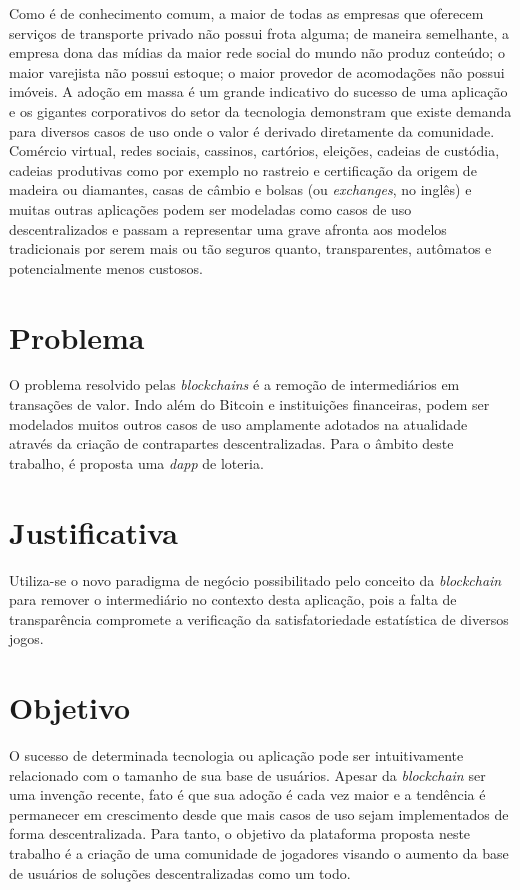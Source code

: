 \documentclass[a4paper,12pt]{monografia}
\theoremstyle{plain}
\theoremstyle{definition}
\theoremstyle{remark}
\begin{document}
Como \'{e} de conhecimento comum, a maior de todas as empresas que oferecem servi\c{c}os de transporte privado n\~{a}o possui frota alguma; de maneira semelhante, a empresa dona das m\'{i}dias da maior rede social do mundo n\~{a}o produz conte\'{u}do; o maior varejista n\~{a}o possui estoque; o maior provedor de acomoda\c{c}\~{o}es n\~{a}o possui im\'{o}veis.
A ado\c{c}\~{a}o em massa \'{e} um grande indicativo do sucesso de uma aplica\c{c}\~{a}o e os gigantes corporativos do setor da tecnologia demonstram que existe demanda para diversos casos de uso onde o valor \'{e} derivado diretamente da comunidade.
Com\'{e}rcio virtual, redes sociais, cassinos, cart\'{o}rios, elei\c{c}\~{o}es, cadeias de cust\'{o}dia, cadeias produtivas como por exemplo no rastreio e certifica\c{c}\~{a}o da origem de madeira ou diamantes, casas de c\^{a}mbio e bolsas (ou \textit{exchanges}, no ingl\^{e}s) e muitas outras aplica\c{c}\~{o}es podem ser modeladas como casos de uso descentralizados e passam a representar uma grave afronta aos modelos tradicionais por serem mais ou t\~{a}o seguros quanto, transparentes, aut\^{o}matos e potencialmente menos custosos.

\section{Problema}
O problema resolvido pelas \textit{blockchains} \'{e} a remo\c{c}\~{a}o de intermedi\'{a}rios em transa\c{c}\~{o}es de valor.
Indo al\'{e}m do Bitcoin e institui\c{c}\~{o}es financeiras, podem ser modelados muitos outros casos de uso amplamente adotados na atualidade atrav\'{e}s da cria\c{c}\~{a}o de contrapartes descentralizadas.
Para o \^{a}mbito deste trabalho, \'{e} proposta uma \textit{dapp} de loteria.

\section{Justificativa}
Utiliza-se o novo paradigma de neg\'{o}cio possibilitado pelo conceito da \textit{blockchain} para remover o intermedi\'{a}rio no contexto desta aplica\c{c}\~{a}o, pois a falta de transpar\^encia compromete a verifica\c{c}\~ao da satisfatoriedade estat\'istica de diversos jogos.

\section{Objetivo}
O sucesso de determinada tecnologia ou aplica\c{c}\~{a}o pode ser intuitivamente relacionado com o tamanho de sua base de usu\'{a}rios.
Apesar da \textit{blockchain} ser uma inven\c{c}\~{a}o recente, fato \'{e} que sua ado\c{c}\~{a}o \'{e} cada vez maior e a tend\^{e}ncia \'{e} permanecer em crescimento desde que mais casos de uso sejam implementados de forma descentralizada.
Para tanto, o objetivo da plataforma proposta neste trabalho \'{e} a cria\c{c}\~{a}o de uma comunidade de jogadores visando o aumento da base de usu\'{a}rios de solu\c{c}\~{o}es descentralizadas como um todo.
\end{document}
